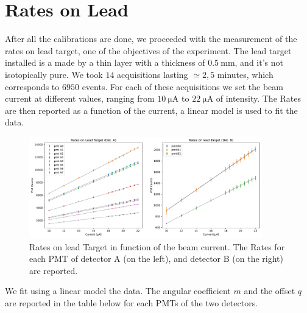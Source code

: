 \section{Rates on Lead}

After all the calibrations are done, we proceeded with the measurement of the rates on lead target, one of the objectives of the experiment.
The lead target installed is a made by a thin layer with a thickness of $\SI{0.5}{\milli \meter}$, and it's not isotopically pure.
We took $14$ acquisitions lasting $\simeq 2,5$ minutes, which corresponds to $6950$ events. For each of these acquisitions we set the beam current at different values, ranging from $\SI{10}{\micro \ampere}$ to $\SI{22}{\micro \ampere}$ of intensity. The Rates are then reported as a function of the current, a linear model is used to fit the data.

\begin{figure}[hbtp]
\centering
\includegraphics[width = 0.9\textwidth]{Analysis/LeadRates/LeadRates.pdf}
\caption{Rates on lead Target in function of the beam current. The Rates for each PMT of detector A (on the left), and detector B (on the right) are reported.}
\end{figure}

We fit using a linear model the data. The angular coefficient $m$ and the offset $q$ are reported in the table below for each PMTs of the two detectors.  


